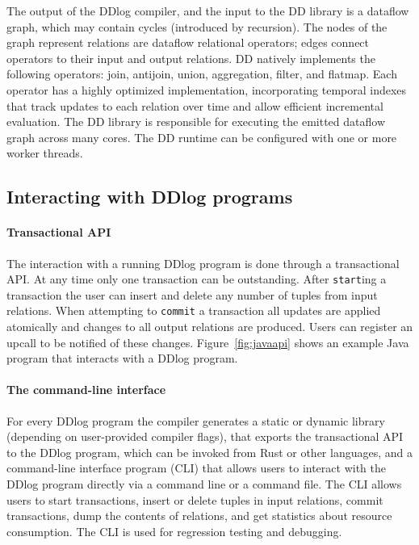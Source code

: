 The output of the DDlog compiler, and the input to the DD library is a
dataflow graph, which may contain cycles (introduced by
recursion).  The nodes of the graph represent relations are dataflow
relational operators; edges connect operators to their input and output
relations.  DD natively implements
the following operators: join, antijoin, union, aggregation,
filter, and flatmap.  Each operator has a highly optimized
implementation, incorporating temporal indexes that track
updates to each relation over time and allow efficient incremental evaluation.
The DD library is responsible for executing the emitted
dataflow graph across many cores.  The
DD runtime can be configured with one or more worker threads.

\subsection{Interacting with DDlog programs}

\paragraph{Transactional API}
The interaction with a running DDlog program is done through a
transactional API.  At any time only one transaction can be
outstanding.  After \texttt{start}ing a transaction the user can
insert and delete any number of tuples from input relations.  When
attempting to \texttt{commit} a transaction all updates are applied
atomically and changes to all output relations are produced.  Users
can register an upcall to be notified of these changes.
Figure~\ref{fig:javaapi}
shows an example Java program that interacts with a DDlog program.

\paragraph{The command-line interface}
For every DDlog program the compiler generates a static or dynamic library
(depending on user-provided compiler flags), that exports the transactional API
to the DDlog program, which can be
invoked from Rust or other languages, and a
command-line interface program (CLI) that allows users to interact
with the DDlog program directly via a command line or a command file.
The CLI allows users to start
transactions, insert or delete tuples in input relations, commit
transactions, dump the contents of relations, and get statistics
about resource consumption.  The CLI is used for regression testing
and debugging.

